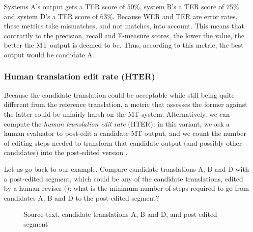 \documentclass[output=paper]{langscibook}
\begin{document}
Systems A’s output gets a TER score of 50\%, system B’s a TER score of 75\% and system D’s a TER score of 63\%. Because WER and TER are error rates, these metrics take mismatches, and not matches, into account. This means that contrarily to the precision, recall and F-measure scores, the lower the value, the better the MT output is deemed to be. Thus, according to this metric, the best output would be candidate A.

\subsubsection{Human translation edit rate (HTER)}

Because the candidate translation could be acceptable while still being quite different from the reference translation, a metric that assesses the former against the latter could be unfairly harsh on the MT system. Alternatively, we can compute the \textit{human translation edit rate} (HTER): in this variant, we ask a human evaluator to post-edit a candidate MT output, and we count the number of editing steps needed to transform that candidate output (and possibly other candidates) into the post-edited version \citep{snover-etal-2006-study}.

Let us go back to our example. Compare candidate translations A, B and D with a post-edited segment, which could be any of the candidate translations, edited by a human reviser (): what is the minimum number of steps required to go from candidates A, B and D to the post-edited segment?

\begin{figure}
\caption{Source text, candidate translations A, B and D, and post-edited segment\label{fig:rossi:8}}
\end{figure}
\end{document}
